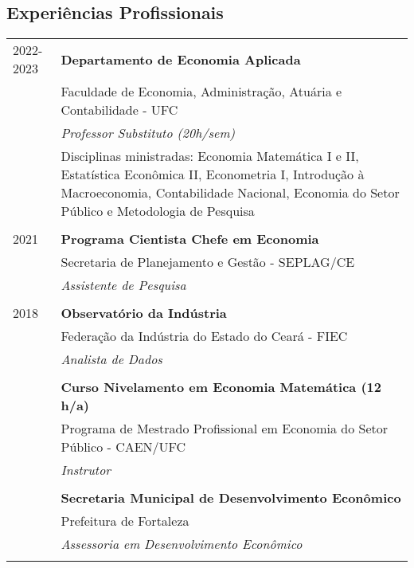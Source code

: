 \documentclass[a4paper,12pt]{article}
\begin{document}
	\subsection*{Experiências Profissionais}
	\setlength{\LTleft}{0pt}
	\begin{longtable}[t]{>{\raggedleft\arraybackslash}p{2.0cm}>{\raggedright\arraybackslash}p{13.5cm}}
		\textsc{2022-2023} & \textbf{Departamento de Economia Aplicada} \\
		& Faculdade de Economia, Administração, Atuária e Contabilidade - UFC \\
		& \textit{Professor Substituto (20h/sem)} \\
		& Disciplinas ministradas: Economia Matemática I e II, Estatística Econômica II, Econometria I, Introdução à Macroeconomia, Contabilidade Nacional, Economia do Setor Público e Metodologia de Pesquisa \\
		\multicolumn{2}{c}{\vspace{-0.2cm}} \\

		\textsc{2021} & \textbf{Programa Cientista Chefe em Economia} \\
		& Secretaria de Planejamento e Gestão - SEPLAG/CE \\
		& \textit{Assistente de Pesquisa} \\
		\multicolumn{2}{c}{\vspace{-0.2cm}} \\

		\textsc{2018} & \textbf{Observatório da Indústria} \\
		& Federação da Indústria do Estado do Ceará - FIEC \\
		& \textit{Analista de Dados} \\
		\multicolumn{2}{c}{\vspace{-0.2cm}} \\

		2017 & \textbf{Curso Nivelamento em Economia Matemática (12 h/a)} \\
		& Programa de Mestrado Profissional em Economia do Setor Público - CAEN/UFC \\
		& \textit{Instrutor} \\
		\multicolumn{2}{c}{\vspace{-0.2cm}} \\

		2017 & \textbf{Secretaria Municipal de Desenvolvimento Econômico} \\
		& Prefeitura de Fortaleza \\
		& \textit{Assessoria em Desenvolvimento Econômico} \\
		\multicolumn{2}{c}{\vspace{-0.2cm}} \\


\end{longtable}
\end{document}
